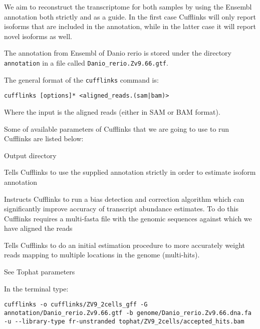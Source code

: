 We aim to reconstruct the transcriptome for both samples by using the Ensembl
annotation both strictly and as a guide. In the first case Cufflinks will only
report isoforms that are included in the annotation, while in the latter case
it will report novel isoforms as well.

The annotation from Ensembl of Danio rerio is stored under the directory
\texttt{annotation} in a file called \texttt{Danio\_rerio.Zv9.66.gtf}.

\begin{information}
The general format of the \texttt{cufflinks} command is:
\begin{lstlisting}
cufflinks [options]* <aligned_reads.(sam|bam)>
\end{lstlisting}
Where the input is the aligned reads (either in SAM or BAM format).
\end{information}

\begin{note}
Some of available parameters of Cufflinks that we are going to use to run
Cufflinks are listed below:
\begin{description}[style=multiline,labelindent=0cm,align=right,leftmargin=\descriptionlabelspace,rightmargin=1.5cm,font=\ttfamily]
  \item[-o] Output directory
  \item[-G] Tells Cufflinks to use the supplied annotation strictly in order
  to estimate isoform annotation
  \item[-b] Instructs Cufflinks to run a bias detection and correction algorithm
  which can significantly improve accuracy of transcript abundance estimates.
  To do this Cufflinks requires a multi-fasta file with the genomic sequences
  against which we have aligned the reads
  \item[-u] Tells Cufflinks to do an initial estimation procedure to more
  accurately weight reads mapping to multiple locations in the genome
  (multi-hits). 
  \item[--library-type] See Tophat parameters
\end{description}
\end{note}

\begin{steps}
In the terminal type:
\begin{lstlisting}
cufflinks -o cufflinks/ZV9_2cells_gff -G annotation/Danio_rerio.Zv9.66.gtf -b genome/Danio_rerio.Zv9.66.dna.fa -u --library-type fr-unstranded tophat/ZV9_2cells/accepted_hits.bam
\end{lstlisting}
\end{steps}

